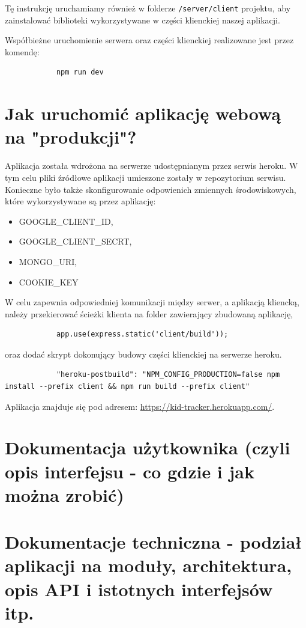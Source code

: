 \documentclass{sprawozdanie-agh}
\begin{document}
		Tę instrukcję uruchamiamy również w folderze \lstinline{/server/client} projektu, aby zainstalować biblioteki wykorzystywane w części klienckiej naszej aplikacji.

		Współbieżne uruchomienie serwera oraz części klienckiej realizowane jest przez komendę:
		\begin{lstlisting}
			npm run dev
		\end{lstlisting}

	\section{Jak uruchomić aplikację webową na "produkcji"?}
		Aplikacja została wdrożona na serwerze udostępnianym przez serwis heroku.
		W tym celu pliki źródłowe aplikacji umieszone zostały w repozytorium serwisu.
		Konieczne było także skonfigurowanie odpowienich zmiennych środowiskowych, które wykorzystywane są przez aplikację: 
		\begin{itemize}
			\item GOOGLE\_CLIENT\_ID,
			\item GOOGLE\_CLIENT\_SECRT,
			\item MONGO\_URI,
			\item COOKIE\_KEY
		\end{itemize}
		W celu zapewnia odpowiedniej komunikacji między serwer, a aplikacją kliencką, należy przekierować ścieżki klienta na 
		folder zawierający zbudowaną aplikację,
		\begin{lstlisting}
			app.use(express.static('client/build'));
		\end{lstlisting}
		oraz dodać skrypt dokonujący budowy części klienckiej na serwerze heroku.
		\begin{lstlisting}
			"heroku-postbuild": "NPM_CONFIG_PRODUCTION=false npm install --prefix client && npm run build --prefix client"
		\end{lstlisting}
		Aplikacja znajduje się pod adresem: \href{https://kid-tracker.herokuapp.com/}{https://kid-tracker.herokuapp.com/}.

	\section{Dokumentacja użytkownika (czyli opis interfejsu - co gdzie i jak można zrobić)}

	\section{Dokumentacje techniczna - podział aplikacji na moduły, architektura, opis API i istotnych interfejsów itp.}
\end{document}
